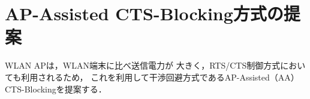 \documentclass[12pt]{jreport}
\begin{document}







\chapter{AP-Assisted CTS-Blocking方式の提案}
\label{aa_cts}

WLAN APは，WLAN端末に比べ送信電力が
大きく，RTS/CTS制御方式においても利用されるため，
これを利用して干渉回避方式であるAP-Assisted（AA）
CTS-Blockingを提案する．

\end{document}
